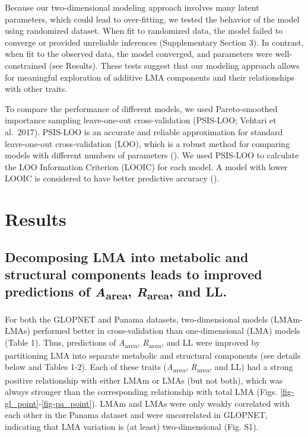 \documentclass[
  12pt,
  letterpaper,
  DIV=11,
  numbers=noendperiod]{scrartcl}
\begin{document}
Because our two-dimensional modeling approach involves many latent
parameters, which could lead to over-fitting, we tested the behavior of
the model using randomized dataset. When fit to randomized data, the
model failed to converge or provided unreliable inferences
(Supplementary Section 3). In contrast, when fit to the observed data,
the model converged, and parameters were well-constrained (see Results).
These tests suggest that our modeling approach allows for meaningful
exploration of additive LMA components and their relationships with
other traits.

To compare the performance of different models, we used Pareto-smoothed
importance sampling leave-one-out cross-validation (PSIS-LOO; Vehtari et
al.~2017). PSIS-LOO is an accurate and reliable approximation for
standard leave-one-out cross-validation (LOO), which is a robust method
for comparing models with different numbers of parameters
(). We used PSIS-LOO to
calculate the LOO Information Criterion (LOOIC) for each model. A model
with lower LOOIC is considered to have better predictive accuracy
().

\section{Results}\label{results}

\subsection{\texorpdfstring{Decomposing LMA into metabolic and
structural components leads to improved predictions of
\emph{A}\textsubscript{area}, \emph{R}\textsubscript{area}, and
LL.}{Decomposing LMA into metabolic and structural components leads to improved predictions of Aarea, Rarea, and LL.}}\label{decomposing-lma-into-metabolic-and-structural-components-leads-to-improved-predictions-of-aarea-rarea-and-ll.}

For both the GLOPNET and Panama datasets, two-dimensional models
(LMAm-LMAs) performed better in cross-validation than one-dimensional
(LMA) models (Table 1). Thus, predictions of
\emph{A}\textsubscript{area}, \emph{R}\textsubscript{area}, and LL were
improved by partitioning LMA into separate metabolic and structural
components (see details below and Tables 1-2). Each of these traits
(\emph{A}\textsubscript{area}, \emph{R}\textsubscript{area}, and LL) had
a strong positive relationship with either LMAm or LMAs (but not both),
which was always stronger than the corresponding relationship with total
LMA (Figs. \ref{fig-gl_point}-\ref{fig-pa_point}). LMAm and LMAs were
only weakly correlated with each other in the Panama dataset and were
uncorrelated in GLOPNET, indicating that LMA variation is (at least)
two-dimensional (Fig. S1).
\end{document}
